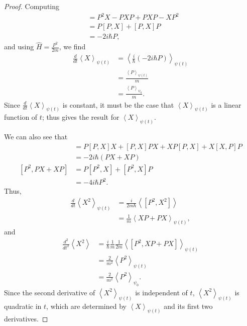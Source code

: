 \documentclass[12pt]{extarticle}
\theoremstyle{plain}
\theoremstyle{definition}
\theoremstyle{remark}
\renewcommand{\newline}{\hfill\break}
\begin{document}
    \begin{proof}
      Computing
      \begin{align*}
        [P^2,X] &= P^2X - PXP + PXP - XP^2\\
                &= P[P,X] + [P,X]P\\
                &= -2i\hbar P,
      \end{align*}
      and using $\hat{H} = \frac{P^2}{2m}$, we find
      \begin{align*}
        \frac{d}{dt}\left\langle X \right\rangle_{\psi(t)} &= \left\langle \frac{i}{\hbar}\left(-2i\hbar P\right) \right\rangle_{\psi(t)}\\
                                                           &= \frac{\left\langle P \right\rangle_{\psi(t)}}{m}\\
                                                           &= \frac{\left\langle P \right\rangle_{\psi_0}}{m}.
      \end{align*}
      Since $\frac{d}{dt}\left\langle X \right\rangle_{\psi(t)}$ is constant, it must be the case that $\left\langle X \right\rangle_{\psi(t)}$ is a linear function of $t$; thus gives the result for $\left\langle X \right\rangle_{\psi(t)}$.\newline

      We can also see that
      \begin{align*}
        [P^2,X^2] &= P[P,X]X + [P,X]PX + XP[P,X] + X[X,P]P\\
                  &= -2i\hbar \left(PX + XP\right)\\
        [P^2,PX + XP] &= P[P^2,X] + [P^2,X]P\\
                      &= -4i\hbar P^2.
      \end{align*}
      Thus,
      \begin{align*}
        \frac{d}{dt}\left\langle X^2 \right\rangle_{\psi(t)} &= \frac{i}{2m\hbar}\left\langle [P^2,X^2] \right\rangle\\
                                                             &= \frac{1}{m}\left\langle XP + PX \right\rangle_{\psi(t)},
      \end{align*}
      and
      \begin{align*}
        \frac{d ^2}{d t^2}\left\langle X^2 \right\rangle &= \frac{i}{\hbar}\frac{1}{m}\frac{1}{2m}\left\langle [P^2,XP + PX] \right\rangle_{\psi(t)}\\
                                                         &= \frac{2}{m^2}\left\langle P^2 \right\rangle_{\psi(t)}\\
                                                         &= \frac{2}{m^2}\left\langle P^2 \right\rangle_{\psi_0}.
      \end{align*}
      Since the second derivative of $\left\langle X^2 \right\rangle_{\psi(t)}$ is independent of $t$, $\left\langle X^2 \right\rangle_{\psi(t)}$ is quadratic in $t$, which are determined by $\left\langle X \right\rangle_{\psi(t)}$ and its first two derivatives.
    \end{proof}
\end{document}

